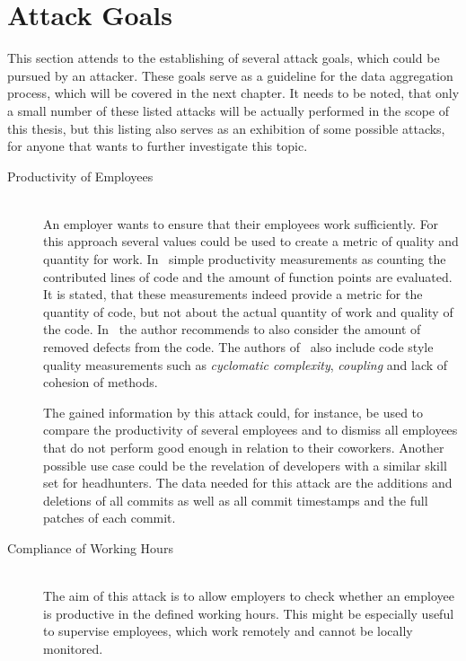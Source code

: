 \section{Attack Goals}\label{attack-goals}
This section attends to the establishing of several attack goals, which could be pursued by an attacker.
These goals serve as a guideline for the data aggregation process, which will be covered in the next chapter.
It needs to be noted, that only a small number of these listed attacks will be actually performed in the scope of this thesis, but this listing also serves as an exhibition of some possible attacks, for anyone that wants to further investigate this topic.

\begin{description}
    \item[Productivity of Employees] \hfill \\
        An employer wants to ensure that their employees work sufficiently.
        For this approach several values could be used to create a metric of quality and quantity for work.
        In~\cite[p.~3]{article:job-productivity} simple productivity measurements as counting the contributed lines of code and the amount of function points are evaluated.
        It is stated, that these measurements indeed provide a metric for the quantity of code, but not about the actual quantity of work and quality of the code.
        In~\cite[p.~43]{article:measuring-programming-quality} the author recommends to also consider the amount of removed defects from the code.
        The authors of~\cite[p.~257]{article:software-productivity} also include code style quality measurements such as \emph{cyclomatic complexity}, \emph{coupling} and lack of cohesion of methods.

        The gained information by this attack could, for instance, be used to compare the productivity of several employees and to dismiss all employees that do not perform good enough in relation to their coworkers.
        Another possible use case could be the revelation of developers with a similar skill set for headhunters.
        The data needed for this attack are the additions and deletions of all commits as well as all commit timestamps and the full patches of each commit.

    \item[Compliance of Working Hours] \hfill \\
        The aim of this attack is to allow employers to check whether an employee is productive in the defined working hours.
        This might be especially useful to supervise employees, which work remotely and cannot be locally monitored.


\end{description}
